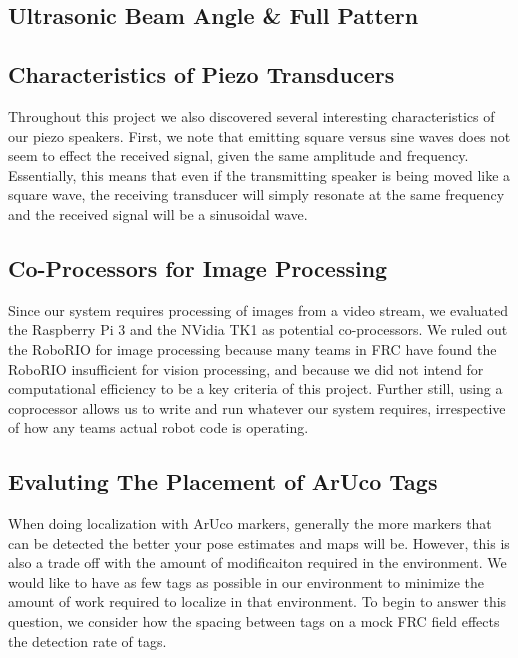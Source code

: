 \documentclass{article}
\begin{document}
  \subsection{Ultrasonic Beam Angle \& Full Pattern}


  \subsection{Characteristics of Piezo Transducers}

    Throughout this project we also discovered several interesting characteristics of our piezo speakers. First, we note that emitting square versus sine waves does not seem to effect the received signal, given the same amplitude and frequency. Essentially, this means that even if the transmitting speaker is being moved like a square wave, the receiving transducer will simply resonate at the same frequency and the received signal will be a sinusoidal wave.

	\subsection{Co-Processors for Image Processing}

    Since our system requires processing of images from a video stream, we evaluated the Raspberry Pi 3 and the NVidia TK1 as potential co-processors. We ruled out the RoboRIO for image processing because many teams in FRC have found the RoboRIO insufficient for vision processing, and because we did not intend for computational efficiency to be a key criteria of this project. Further still, using a coprocessor allows us to write and run whatever our system requires, irrespective of how any teams actual robot code is operating. %

  \subsection{Evaluting The Placement of ArUco Tags} \label{section:tag_placement}

    When doing localization with ArUco markers, generally the more markers that can be detected the better your pose estimates and maps will be. However, this is also a trade off with the amount of modificaiton required in the environment. We would like to have as few tags as possible in our environment to minimize the amount of work required to localize in that environment. To begin to answer this question, we consider how the spacing between tags on a mock FRC field effects the detection rate of tags.
\end{document}

